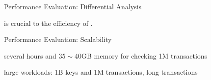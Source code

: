 \begin{frame}{Performance Evaluation: Differential Analysis}
	\begin{center}
		 is crucial to the efficiency of \polysi.

		\vspace{0.30cm}
	\end{center}
\end{frame}

\begin{frame}{Performance Evaluation: Scalability}
	\begin{center}
		several hours and $35 \sim 40$GB memory for checking 1M transactions

		\vspace{0.30cm}
		\vspace{0.30cm}

		large workloads: 1B keys and 1M transactions, long transactions
	\end{center}
\end{frame}
